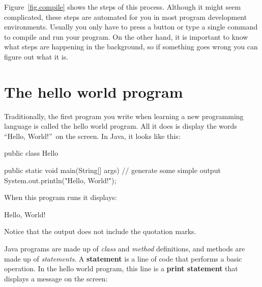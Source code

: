 \documentclass[12pt]{book}
\theoremstyle{exercise}
\newcommand{\java}[1]{\verb"#1"}
\begin{document}
Figure~\ref{fig.compile} shows the steps of this process.
Although it might seem complicated, these steps are automated for you in most program development environments.
Usually you only have to press a button or type a single command to compile and run your program.
On the other hand, it is important to know what steps are happening in the background, so if something goes wrong you can figure out what it is.


\section{The hello world program}
\label{hello}


Traditionally, the first program you write when learning a new programming language is called the hello world program.
All it does is display the words ``Hello, World!''\ on the screen.
In Java, it looks like this:


\begin{code}
public class Hello {

    public static void main(String[] args) {
        // generate some simple output
        System.out.println("Hello, World!");
    }
}
\end{code}

When this program runs it displays:

\begin{stdout}
Hello, World!
\end{stdout}

Notice that the output does not include the quotation marks.




Java programs are made up of {\em class} and {\em method} definitions, and methods are made up of {\em statements}.
A {\bf statement} is a line of code that performs a basic operation.
In the hello world program, this line is a {\bf print statement} that displays a message on the screen:
\end{document}
